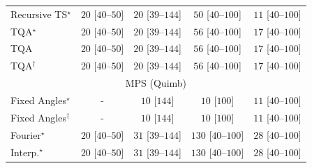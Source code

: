 \begin{tabular}{l|cccc|}
Recursive TS$^\star$ & {\cellcolor[HTML]{F5FBF2}} \color[HTML]{000000} $20$ [$40$--$50$] & {\cellcolor[HTML]{F5FBF2}} \color[HTML]{000000} $20$ [$39$--$144$] & {\cellcolor[HTML]{EFF9EC}} \color[HTML]{000000} $50$ [$40$--$100$] & {\cellcolor[HTML]{F6FCF4}} \color[HTML]{000000} $11$ [$40$--$100$] \\
TQA$^\star$ & {\cellcolor[HTML]{F5FBF2}} \color[HTML]{000000} $20$ [$40$--$50$] & {\cellcolor[HTML]{F5FBF2}} \color[HTML]{000000} $20$ [$39$--$144$] & {\cellcolor[HTML]{EEF8EA}} \color[HTML]{000000} $56$ [$40$--$100$] & {\cellcolor[HTML]{F5FBF3}} \color[HTML]{000000} $17$ [$40$--$100$] \\
TQA & {\cellcolor[HTML]{F5FBF2}} \color[HTML]{000000} $20$ [$40$--$50$] & {\cellcolor[HTML]{F5FBF2}} \color[HTML]{000000} $20$ [$39$--$144$] & {\cellcolor[HTML]{EEF8EA}} \color[HTML]{000000} $56$ [$40$--$100$] & {\cellcolor[HTML]{F5FBF3}} \color[HTML]{000000} $17$ [$40$--$100$] \\
TQA$^\dagger$ & {\cellcolor[HTML]{F5FBF2}} \color[HTML]{000000} $20$ [$40$--$50$] & {\cellcolor[HTML]{F5FBF2}} \color[HTML]{000000} $20$ [$39$--$144$] & {\cellcolor[HTML]{EEF8EA}} \color[HTML]{000000} $56$ [$40$--$100$] & {\cellcolor[HTML]{F5FBF3}} \color[HTML]{000000} $17$ [$40$--$100$] \\
\cline{1-5}
\multicolumn{5}{c}{\rule{0pt}{8pt}MPS (Quimb)} \\
\midrule
Fixed Angles$^\star$ & {\cellcolor[HTML]{000000}} \color[HTML]{F1F1F1} {\cellcolor{white}} \color{black} - & {\cellcolor[HTML]{F7FCF5}} \color[HTML]{000000} $10$ [$144$] & {\cellcolor[HTML]{F7FCF5}} \color[HTML]{000000} $10$ [$100$] & {\cellcolor[HTML]{F6FCF4}} \color[HTML]{000000} $11$ [$40$--$100$] \\
Fixed Angles$^\dagger$ & {\cellcolor[HTML]{000000}} \color[HTML]{F1F1F1} {\cellcolor{white}} \color{black} - & {\cellcolor[HTML]{F7FCF5}} \color[HTML]{000000} $10$ [$144$] & {\cellcolor[HTML]{F7FCF5}} \color[HTML]{000000} $10$ [$100$] & {\cellcolor[HTML]{F6FCF4}} \color[HTML]{000000} $11$ [$40$--$100$] \\
Fourier$^\star$ & {\cellcolor[HTML]{F5FBF2}} \color[HTML]{000000} $20$ [$40$--$50$] & {\cellcolor[HTML]{F3FAF0}} \color[HTML]{000000} $31$ [$39$--$144$] & {\cellcolor[HTML]{DDF2D8}} \color[HTML]{000000} $130$ [$40$--$100$] & {\cellcolor[HTML]{F4FBF1}} \color[HTML]{000000} $28$ [$40$--$100$] \\
Interp.$^\star$ & {\cellcolor[HTML]{F5FBF2}} \color[HTML]{000000} $20$ [$40$--$50$] & {\cellcolor[HTML]{F3FAF0}} \color[HTML]{000000} $31$ [$39$--$144$] & {\cellcolor[HTML]{DDF2D8}} \color[HTML]{000000} $130$ [$40$--$100$] & {\cellcolor[HTML]{F4FBF1}} \color[HTML]{000000} $28$ [$40$--$100$] \\

\end{tabular}
